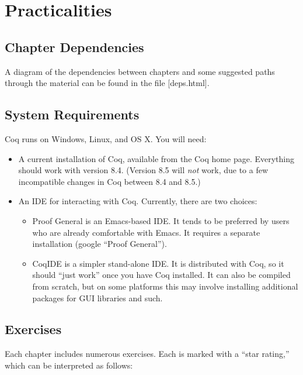 \section{Practicalities}\label{practicalities}

\subsection{Chapter Dependencies}\label{chapter-dependencies}

A diagram of the dependencies between chapters and some suggested paths
through the material can be found in the file {[}deps.html{]}.

\subsection{System Requirements}\label{system-requirements}

Coq runs on Windows, Linux, and OS X. You will need:

\begin{itemize}
\item
  A current installation of Coq, available from the Coq home page.
  Everything should work with version 8.4. (Version 8.5 will \emph{not}
  work, due to a few incompatible changes in Coq between 8.4 and 8.5.)
\item
  An IDE for interacting with Coq. Currently, there are two choices:

  \begin{itemize}
  \item
    Proof General is an Emacs-based IDE. It tends to be preferred by
    users who are already comfortable with Emacs. It requires a separate
    installation (google ``Proof General'').
  \item
    CoqIDE is a simpler stand-alone IDE. It is distributed with Coq, so
    it should ``just work'' once you have Coq installed. It can also be
    compiled from scratch, but on some platforms this may involve
    installing additional packages for GUI libraries and such.
  \end{itemize}
\end{itemize}

\subsection{Exercises}\label{exercises}

Each chapter includes numerous exercises. Each is marked with a ``star
rating,'' which can be interpreted as follows:

